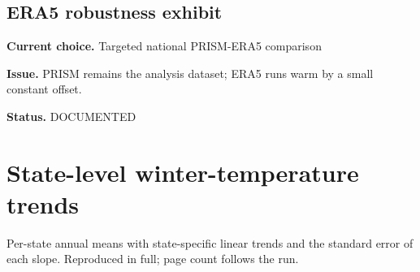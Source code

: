 \documentclass[11pt, english, letterpaper]{article}
\newcommand*{\figTwo}{exhibits}%
\begin{document}
\subsection*{ERA5 robustness exhibit}
\textbf{Current choice.} Targeted national PRISM-ERA5 comparison\par
\textbf{Issue.} PRISM remains the analysis dataset; ERA5 runs warm by a small constant offset.\par
\textbf{Status.} DOCUMENTED
\clearpage
\appendix
\section{State-level winter-temperature trends}
\label{app:states}
Per-state annual means with state-specific linear trends and the standard error
of each slope. Reproduced in full; page count follows the run.

\end{document}
